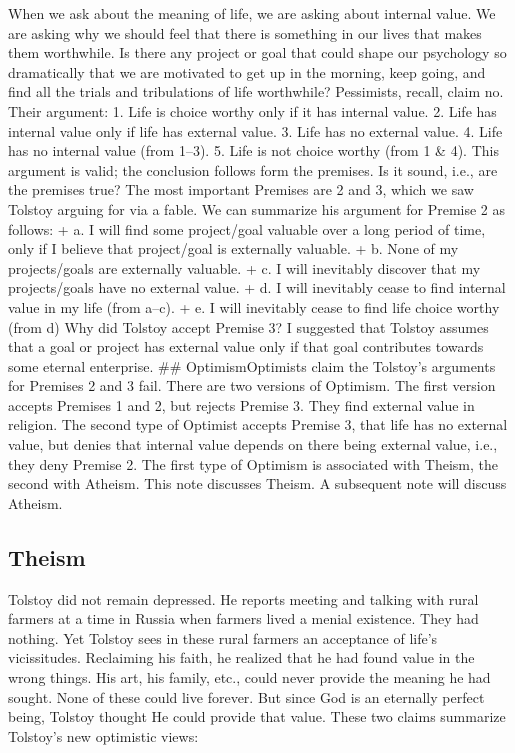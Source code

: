 \documentclass[]{article}
\begin{document}
When we ask about the meaning of life, we are asking about internal
value. We are asking why we should feel that there is something in our
lives that makes them worthwhile. Is there any project or goal that
could shape our psychology so dramatically that we are motivated to get
up in the morning, keep going, and find all the trials and tribulations
of life worthwhile? Pessimists, recall, claim no. Their argument: 1.
Life is choice worthy only if it has internal value. 2. Life has
internal value only if life has external value. 3. Life has no external
value. 4. Life has no internal value (from 1--3). 5. Life is not choice
worthy (from 1 \& 4). This argument is valid; the conclusion follows
form the premises. Is it sound, i.e., are the premises true? The most
important Premises are 2 and 3, which we saw Tolstoy arguing for via a
fable. We can summarize his argument for Premise 2 as follows: + a. I
will find some project/goal valuable over a long period of time, only if
I believe that project/goal is externally valuable. + b. None of my
projects/goals are externally valuable. + c. I will inevitably discover
that my projects/goals have no external value. + d. I will inevitably
cease to find internal value in my life (from a--c). + e. I will
inevitably cease to find life choice worthy (from d) Why did Tolstoy
accept Premise 3? I suggested that Tolstoy assumes that a goal or
project has external value only if that goal contributes towards some
eternal enterprise. \#\# OptimismOptimists claim the Tolstoy's arguments
for Premises 2 and 3 fail. There are two versions of Optimism. The first
version accepts Premises 1 and 2, but rejects Premise 3. They find
external value in religion. The second type of Optimist accepts Premise
3, that life has no external value, but denies that internal value
depends on there being external value, i.e., they deny Premise 2. The
first type of Optimism is associated with Theism, the second with
Atheism. This note discusses Theism. A subsequent note will discuss
Atheism.

\subsection{Theism}\label{theism}

Tolstoy did not remain depressed. He reports meeting and talking with
rural farmers at a time in Russia when farmers lived a menial existence.
They had nothing. Yet Tolstoy sees in these rural farmers an acceptance
of life's vicissitudes. Reclaiming his faith, he realized that he had
found value in the wrong things. His art, his family, etc., could never
provide the meaning he had sought. None of these could live forever. But
since God is an eternally perfect being, Tolstoy thought He could
provide that value. These two claims summarize Tolstoy's new optimistic
views:
\end{document}
